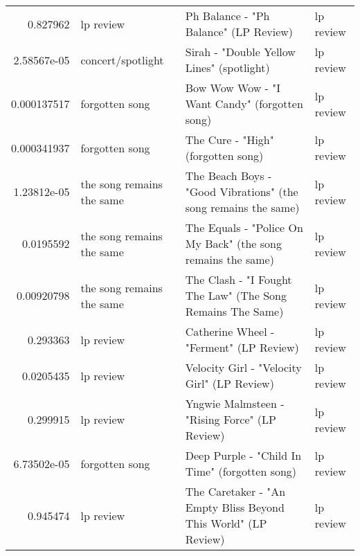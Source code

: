 \documentclass[letterpaper,10pt]{article}
\begin{document}
\begin{table}[H]
\begin{adjustbox}{max width=\linewidth}
\begin{tabular}{rlll}
  0.827962    & lp review                 & Ph Balance - "Ph Balance" (LP Review)                                                                        & lp review                 \\
  2.58567e-05 & concert/spotlight         & Sirah - "Double Yellow Lines" (spotlight)                                                                    & lp review                 \\
  0.000137517 & forgotten song            & Bow Wow Wow - "I Want Candy" (forgotten song)                                                                & lp review                 \\
  0.000341937 & forgotten song            & The Cure - "High" (forgotten song)                                                                           & lp review                 \\
  1.23812e-05 & the song remains the same & The Beach Boys - "Good Vibrations" (the song remains the same)                                               & lp review                 \\
  0.0195592   & the song remains the same & The Equals - "Police On My Back" (the song remains the same)                                                 & lp review                 \\
  0.00920798  & the song remains the same & The Clash - "I Fought The Law" (The Song Remains The Same)                                                   & lp review                 \\
  0.293363    & lp review                 & Catherine Wheel - "Ferment" (LP Review)                                                                      & lp review                 \\
  0.0205435   & lp review                 & Velocity Girl - "Velocity Girl" (LP Review)                                                                  & lp review                 \\
  0.299915    & lp review                 & Yngwie Malmsteen - "Rising Force" (LP Review)                                                                & lp review                 \\
  6.73502e-05 & forgotten song            & Deep Purple - "Child In Time" (forgotten song)                                                               & lp review                 \\
  0.945474    & lp review                 & The Caretaker - "An Empty Bliss Beyond This World" (LP Review)                                               & lp review                 \\

\end{tabular}
\end{adjustbox}
\end{table}
\end{document}
